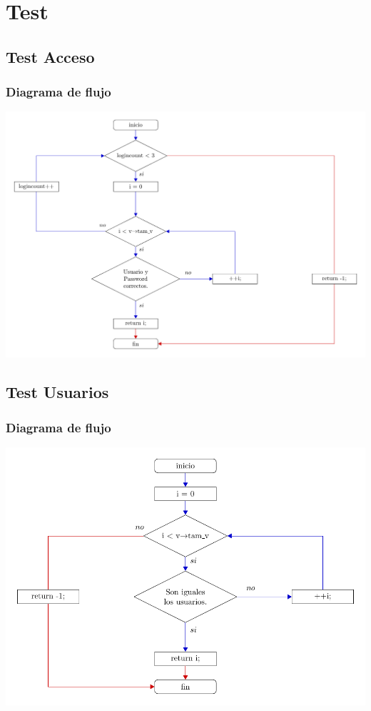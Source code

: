 \section{Test}
\subsection{Test Acceso}
\subsubsection{Diagrama de flujo}
\includegraphics[width=\textwidth, angle=0,scale=0.75]{dep/flujoacceso.pdf}
\subsection{Test Usuarios}
\subsubsection{Diagrama de flujo}
\includegraphics[width=\textwidth, angle=0,scale=0.75]{dep/flujousuarios.pdf}
